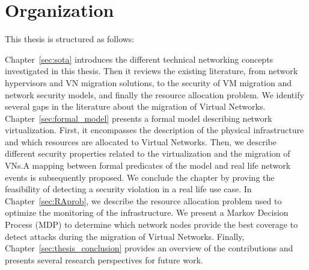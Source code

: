 
\section{Organization}
This thesis is structured as follows: 


Chapter~\ref{sec:sota} introduces the different technical networking concepts investigated in this thesis. Then it reviews the existing literature, from network hypervisors and VN migration solutions, to the security of VM migration and network security models, and finally the resource allocation problem. We identify several gaps in the literature about the migration of Virtual Networks.
Chapter~\ref{sec:formal_model} presents a formal model describing network virtualization. 
First, it encompasses the description of the physical infrastructure and which resources are allocated to Virtual Networks. Then, we describe different security properties related to the virtualization and the migration of VNs.A mapping between formal predicates of the model and real life network events is subsequently proposed. We conclude the chapter by proving the feasibility of detecting a security violation in a real life use case.
In Chapter~\ref{sec:RAprob}, we describe  the resource allocation problem used to optimize the monitoring of the infrastructure.
We present a Markov Decision Process (MDP) to determine which network nodes provide the best coverage to detect attacks during the migration of Virtual Networks.
Finally, Chapter~\ref{sec:thesis_conclusion} provides an overview of the contributions and presents several research perspectives for future work.
